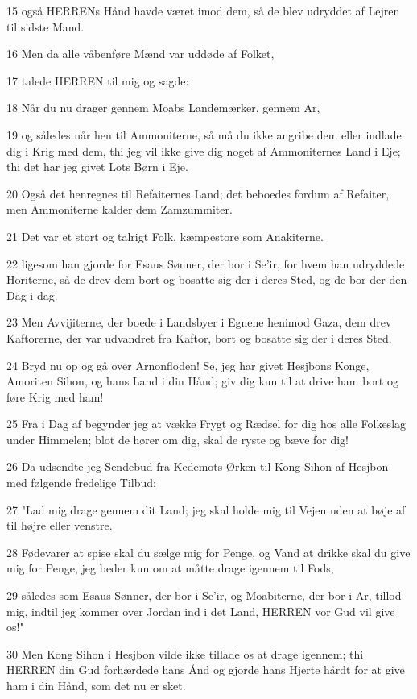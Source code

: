 \par 15 også HERRENs Hånd havde været imod dem, så de blev udryddet af Lejren til sidste Mand.
\par 16 Men da alle våbenføre Mænd var uddøde af Folket,
\par 17 talede HERREN til mig og sagde:
\par 18 Når du nu drager gennem Moabs Landemærker, gennem Ar,
\par 19 og således når hen til Ammoniterne, så må du ikke angribe dem eller indlade dig i Krig med dem, thi jeg vil ikke give dig noget af Ammoniternes Land i Eje; thi det har jeg givet Lots Børn i Eje.
\par 20 Også det henregnes til Refaiternes Land; det beboedes fordum af Refaiter, men Ammoniterne kalder dem Zamzummiter.
\par 21 Det var et stort og talrigt Folk, kæmpestore som Anakiterne.
\par 22 ligesom han gjorde for Esaus Sønner, der bor i Se'ir, for hvem han udryddede Horiterne, så de drev dem bort og bosatte sig der i deres Sted, og de bor der den Dag i dag.
\par 23 Men Avvijiterne, der boede i Landsbyer i Egnene henimod Gaza, dem drev Kaftorerne, der var udvandret fra Kaftor, bort og bosatte sig der i deres Sted.
\par 24 Bryd nu op og gå over Arnonfloden! Se, jeg har givet Hesjbons Konge, Amoriten Sihon, og hans Land i din Hånd; giv dig kun til at drive ham bort og føre Krig med ham!
\par 25 Fra i Dag af begynder jeg at vække Frygt og Rædsel for dig hos alle Folkeslag under Himmelen; blot de hører om dig, skal de ryste og bæve for dig!
\par 26 Da udsendte jeg Sendebud fra Kedemots Ørken til Kong Sihon af Hesjbon med følgende fredelige Tilbud:
\par 27 "Lad mig drage gennem dit Land; jeg skal holde mig til Vejen uden at bøje af til højre eller venstre.
\par 28 Fødevarer at spise skal du sælge mig for Penge, og Vand at drikke skal du give mig for Penge, jeg beder kun om at måtte drage igennem til Fods,
\par 29 således som Esaus Sønner, der bor i Se'ir, og Moabiterne, der bor i Ar, tillod mig, indtil jeg kommer over Jordan ind i det Land, HERREN vor Gud vil give os!"
\par 30 Men Kong Sihon i Hesjbon vilde ikke tillade os at drage igennem; thi HERREN din Gud forhærdede hans Ånd og gjorde hans Hjerte hårdt for at give ham i din Hånd, som det nu er sket.
